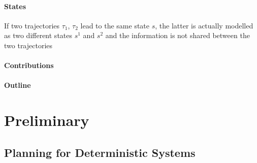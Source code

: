 \documentclass[runningheads]{llncs}
\begin{document}
\paragraph{States}



If two trajectories $\tau_1$, $\tau_2$ lead to the same state $s$, the latter is actually modelled as two different states $s^1$ and $s^2$ and the information is not shared between the two trajectories

\paragraph{Contributions}

\paragraph{Outline}


\section{Preliminary}
\subsection{Planning for Deterministic Systems}
\end{document}
